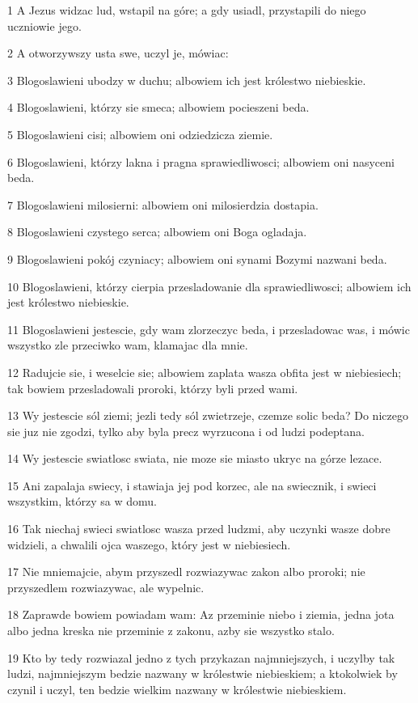 \par 1 A Jezus widzac lud, wstapil na góre; a gdy usiadl, przystapili do niego uczniowie jego.
\par 2 A otworzywszy usta swe, uczyl je, mówiac:
\par 3 Blogoslawieni ubodzy w duchu; albowiem ich jest królestwo niebieskie.
\par 4 Blogoslawieni, którzy sie smeca; albowiem pocieszeni beda.
\par 5 Blogoslawieni cisi; albowiem oni odziedzicza ziemie.
\par 6 Blogoslawieni, którzy lakna i pragna sprawiedliwosci; albowiem oni nasyceni beda.
\par 7 Blogoslawieni milosierni: albowiem oni milosierdzia dostapia.
\par 8 Blogoslawieni czystego serca; albowiem oni Boga ogladaja.
\par 9 Blogoslawieni pokój czyniacy; albowiem oni synami Bozymi nazwani beda.
\par 10 Blogoslawieni, którzy cierpia przesladowanie dla sprawiedliwosci; albowiem ich jest królestwo niebieskie.
\par 11 Blogoslawieni jestescie, gdy wam zlorzeczyc beda, i przesladowac was, i mówic wszystko zle przeciwko wam, klamajac dla mnie.
\par 12 Radujcie sie, i weselcie sie; albowiem zaplata wasza obfita jest w niebiesiech; tak bowiem przesladowali proroki, którzy byli przed wami.
\par 13 Wy jestescie sól ziemi; jezli tedy sól zwietrzeje, czemze solic beda? Do niczego sie juz nie zgodzi, tylko aby byla precz wyrzucona i od ludzi podeptana.
\par 14 Wy jestescie swiatlosc swiata, nie moze sie miasto ukryc na górze lezace.
\par 15 Ani zapalaja swiecy, i stawiaja jej pod korzec, ale na swiecznik, i swieci wszystkim, którzy sa w domu.
\par 16 Tak niechaj swieci swiatlosc wasza przed ludzmi, aby uczynki wasze dobre widzieli, a chwalili ojca waszego, który jest w niebiesiech.
\par 17 Nie mniemajcie, abym przyszedl rozwiazywac zakon albo proroki; nie przyszedlem rozwiazywac, ale wypelnic.
\par 18 Zaprawde bowiem powiadam wam: Az przeminie niebo i ziemia, jedna jota albo jedna kreska nie przeminie z zakonu, azby sie wszystko stalo.
\par 19 Kto by tedy rozwiazal jedno z tych przykazan najmniejszych, i uczylby tak ludzi, najmniejszym bedzie nazwany w królestwie niebieskiem; a ktokolwiek by czynil i uczyl, ten bedzie wielkim nazwany w królestwie niebieskiem.
